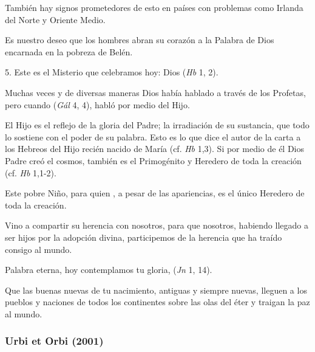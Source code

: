 \begin{body}
					También hay signos prometedores de esto en países con problemas como Irlanda del Norte y Oriente Medio.
					
					Es nuestro deseo que los hombres abran su corazón a la Palabra de Dios encarnada en la pobreza de Belén.
					
					5. Este es el Misterio que celebramos hoy: Dios  (\emph{Hb} 1, 2).
					
					Muchas veces y de diversas maneras Dios había hablado a través de los Profetas, pero cuando  (\emph{Gál} 4, 4), habló por medio del Hijo.
					
					El Hijo es el reflejo de la gloria del Padre; la irradiación de su sustancia, que todo lo sostiene con el poder de su palabra. Esto es lo que dice el autor de la carta a los Hebreos del Hijo recién nacido de María (cf. \emph{Hb} 1,3). Si por medio de él Dios Padre creó el cosmos, también es el Primogénito y Heredero de toda la creación (cf. \emph{Hb} 1,1-2).
					
					Este pobre Niño, para quien , a pesar de las apariencias, es el único Heredero de toda la creación.
					
					Vino a compartir su herencia con nosotros, para que nosotros, habiendo llegado a ser hijos por la adopción divina, participemos de la herencia que ha traído consigo al mundo.
					
					Palabra eterna, hoy contemplamos tu gloria,  (\emph{Jn} 1, 14).
					
					Que las buenas nuevas de tu nacimiento, antiguas y siempre nuevas, lleguen a los pueblos y naciones de todos los continentes sobre las olas del éter y traigan la paz al mundo.
				\end{body}


			\subsubsection{Urbi et Orbi (2001)} 
					
